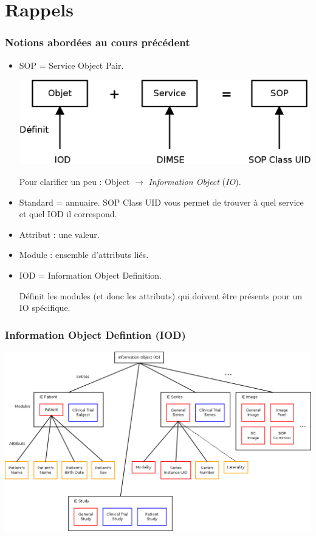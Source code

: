\section{Rappels}

\frame
{
	\frametitle{Notions abord\'ees au cours pr\'ec\'edent}
	
	\begin{itemize}
		\item SOP = Service Object Pair.
		
		\begin{center}
			\includegraphics[width=.8\linewidth]{./figures/sop-definition.png}
		\end{center}
		
		Pour clarifier un peu : Object $\rightarrow$ \emph{Information Object} (\emph{IO}).
		
		\item Standard = annuaire.
		SOP Class UID vous permet de trouver \`a quel service et quel IOD il correspond.
		
		\item Attribut : une valeur.
		
		\item Module : ensemble d'attributs li\'es.
		
		\item IOD = Information Object Definition.
		
		D\'efinit les modules (et donc les attributs) qui doivent \^etre pr\'esents pour un IO sp\'ecifique.
		
	\end{itemize}
}

\frame
{
	\frametitle{Information Object Defintion (IOD)}
	
	\begin{center}
		\includegraphics[width=\linewidth]{./figures/IO-definition.png}
	\end{center}
}
